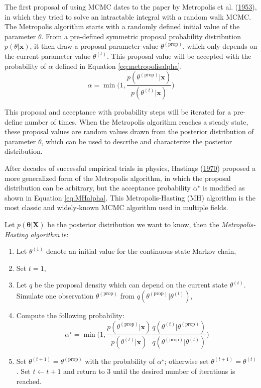 \documentclass[12pt]{book}
\numberwithin{equation}{chapter}
\providecommand{\tightlist}{%
  \setlength{\itemsep}{0pt}\setlength{\parskip}{0pt}}
\begin{document}
The first proposal of using MCMC dates to the paper by Metropolis et al. (\protect\hyperlink{ref-metropolis1953equation}{1953}), in which they tried to solve an intractable integral with a random walk MCMC. The Metropolis algorithm starts with a randomly defined initial value of the parameter \(\theta\). From a pre-defined symmetric proposal probability distribution \(p(\theta | \mathbf{x})\), it then draw a proposal parameter value \(\theta^{(\text{prop})}\), which only depends on the current parameter value \(\theta^{(t)}\). This proposal value will be accepted with the probability of \(\alpha\) defined in Equation \eqref{eq:metropolisalpha}.
\begin{equation}
\alpha = \min\bigg(1, \frac{p(\theta^{(\text{prop})}|\mathbf{x})}{p(\theta^{(t)}|\mathbf{x})}\bigg)
\label{eq:metropolisalpha}
\end{equation}

This proposal and acceptance with probability steps will be iterated for a pre-define number of times. When the Metropolis algorithm reaches a steady state, these proposal values are random values drawn from the posterior distribution of parameter \(\theta\), which can be used to describe and characterize the posterior distribution.

After decades of successful empirical trials in physics, Hastings (\protect\hyperlink{ref-hastings1970monte}{1970}) proposed a more generalized form of the Metropolis algorithm, in which the proposal distribution can be arbitrary, but the acceptance probability \(\alpha^\star\) is modified as shown in Equation \eqref{eq:MHalpha}. This Metropolis-Hasting (MH) algorithm is the most classic and widely-known MCMC algorithm used in multiple fields.

Let \(p(\mathbf{\theta|X})\) be the posterior distribution we want to know, then the \emph{Metropolis-Hasting algorithm} is:

\begin{enumerate}
\def\labelenumi{\arabic{enumi}.}
\tightlist
\item
  Let \(\theta^{(1)}\) denote an initial value for the continuous state Markov chain,
\item
  Set \(t = 1\),
\item
  Let \(q\) be the proposal density which can depend on the current state \(\theta^{(t)}\). Simulate one observation \(\theta^{(\text{prop})}\) from \(q(\theta^{(\text{prop})} | \theta^{(t)})\),
\item
  Compute the following probability:
  \begin{equation}
  \alpha^\star = \min\bigg(1, \frac{p\left(\theta^{(\text{prop})} | \boldsymbol{x}\right)}{p\left(\theta^{(t)} | \boldsymbol{x}\right)} \frac{q\left(\theta^{(t)} | \theta^{(\text{prop})}\right)}{q\left(\theta^{(\text{prop})} | \theta^{(t)}\right)}\bigg)
  \label{eq:MHalpha}
  \end{equation}
\item
  Set \(\theta^{(t+1)} = \theta^{(\text{prop})}\) with the probability of \(\alpha^\star\); otherwise set \(\theta^{(t+1)} = \theta^{(t)}\). Set \(t \leftarrow t + 1\) and return to 3 until the desired number of iterations is reached.
\end{enumerate}
\end{document}
